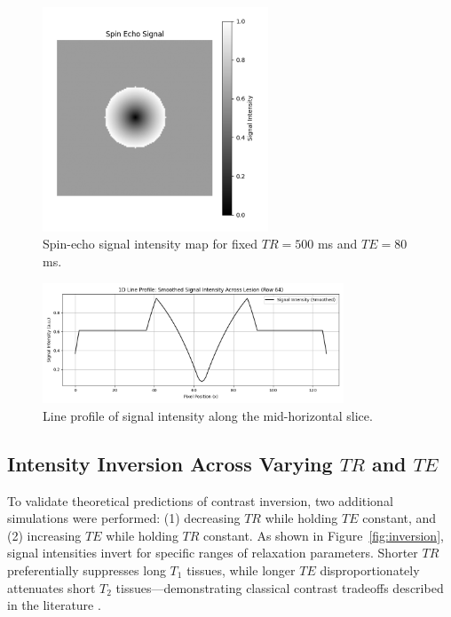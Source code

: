 \documentclass[10pt,a4paper,twoside]{article}
\begin{document}
\begin{figure}[htbp!]
\centering
\includegraphics[width=0.6\textwidth]{signalintensitymap.png}
\caption{Spin-echo signal intensity map for fixed \( TR = 500 \) ms and \( TE = 80 \) ms.}
\label{fig:signalmap}
\end{figure}

\begin{figure}[htbp!]
\centering
\includegraphics[width=0.8\textwidth]{1Dlineprofilesignal.png}
\caption{Line profile of signal intensity along the mid-horizontal slice.}
\label{fig:lineprofile}
\end{figure}

\subsection{Intensity Inversion Across Varying \( TR \) and \( TE \)}

To validate theoretical predictions of contrast inversion, two additional simulations were performed: (1) decreasing \( TR \) while holding \( TE \) constant, and (2) increasing \( TE \) while holding \( TR \) constant. As shown in Figure~\ref{fig:inversion}, signal intensities invert for specific ranges of relaxation parameters. Shorter \( TR \) preferentially suppresses long \( T_1 \) tissues, while longer \( TE \) disproportionately attenuates short \( T_2 \) tissues—demonstrating classical contrast tradeoffs described in the literature \cite{brown2014}.
\end{document}
